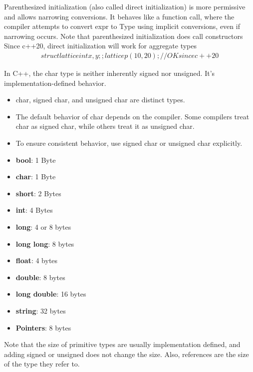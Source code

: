 \documentclass{report}
\begin{document}
    \bigbreak \noindent 
    Parenthesized initialization (also called direct initialization) is more permissive and allows narrowing conversions. It behaves like a function call, where the compiler attempts to convert expr to Type using implicit conversions, even if narrowing occurs.
    \bigbreak \noindent 
    Note that parenthesized initialization does call constructors
    \bigbreak \noindent 
    Since c++20, direct initialization will work for aggregate types
    \begin{align*}
        struct lattice {
            int x,y;
        };
        lattice p(10,20); // OK since c++20
    \end{align*}


    \pagebreak 
    \bigbreak \noindent 
    In C++, the char type is neither inherently signed nor unsigned. It's implementation-defined behavior.
    \begin{itemize}
        \item char, signed char, and unsigned char are distinct types.
        \item The default behavior of char depends on the compiler. Some compilers treat char as signed char, while others treat it as unsigned char.
        \item To ensure consistent behavior, use signed char or unsigned char explicitly.
    \end{itemize}


    \pagebreak 
    \bigbreak \noindent 
    \begin{itemize}
        \item \textbf{bool}: 1 Byte
        \item \textbf{char}: 1 Byte
        \item \textbf{short}: 2 Bytes
        \item \textbf{int}: 4 Bytes
        \item \textbf{long}: 4 or 8 bytes
        \item \textbf{long long}: 8 bytes
        \item \textbf{float}: 4 bytes
        \item \textbf{double}: 8 bytes
        \item \textbf{long double}: 16 bytes
        \item \textbf{string}: 32 bytes
        \item \textbf{Pointers}: 8 bytes
    \end{itemize}
    \bigbreak \noindent 
    Note that the size of primitive types are usually implementation defined, and adding signed or unsigned does not change the size.
    \bigbreak \noindent 
    Also, references are the size of the type they refer to. 
\end{document}

